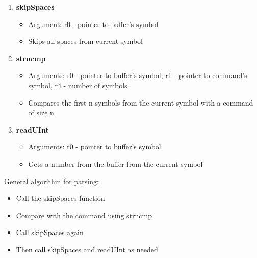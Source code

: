 \begin{enumerate}
	\item \textbf{skipSpaces}
		\begin{itemize}
			\item Argument: r0 - pointer to buffer's symbol
			\item Skips all spaces from current symbol
		\end{itemize}
\item \textbf{strncmp}
	\begin{itemize}
		\item Arguments: r0 - pointer to buffer's symbol, r1 - pointer to command's symbol, r4 - number of symbols
		\item Compares the first n symbols from the current symbol with a command of size n
	\end{itemize}
\item \textbf{readUInt}
	\begin{itemize}
		\item Arguments: r0 - pointer to buffer's symbol
		\item Gets a number from the buffer from the current symbol
	\end{itemize}
\end{enumerate}

General algorithm for parsing:

\begin{itemize}
	\item Call the skipSpaces function
	\item Compare with the command using strncmp
	\item Call skipSpaces again
	\item Then call skipSpaces and readUInt as needed
\end{itemize}
